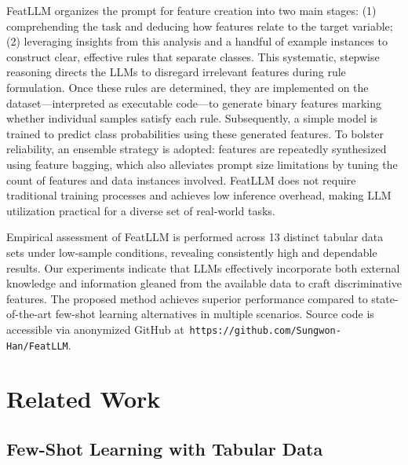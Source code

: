 \textsf{FeatLLM} organizes the prompt for feature creation into two main stages: (1) comprehending the task and deducing how features relate to the target variable; (2) leveraging insights from this analysis and a handful of example instances to construct clear, effective rules that separate classes. This systematic, stepwise reasoning directs the LLMs to disregard irrelevant features during rule formulation. Once these rules are determined, they are implemented on the dataset—interpreted as executable code—to generate binary features marking whether individual samples satisfy each rule. Subsequently, a simple model is trained to predict class probabilities using these generated features. To bolster reliability, an ensemble strategy is adopted: features are repeatedly synthesized using feature bagging, which also alleviates prompt size limitations by tuning the count of features and data instances involved. \textsf{FeatLLM} does not require traditional training processes and achieves low inference overhead, making LLM utilization practical for a diverse set of real-world tasks.

Empirical assessment of \textsf{FeatLLM} is performed across 13 distinct tabular data sets under low-sample conditions, revealing consistently high and dependable results. Our experiments indicate that LLMs effectively incorporate both external knowledge and information gleaned from the available data to craft discriminative features. The proposed method achieves superior performance compared to state-of-the-art few-shot learning alternatives in multiple scenarios. Source code is accessible via anonymized GitHub at~\texttt{https://github.com/Sungwon-Han/FeatLLM}.

\section{Related Work}

\subsection{Few-Shot Learning with Tabular Data} 

